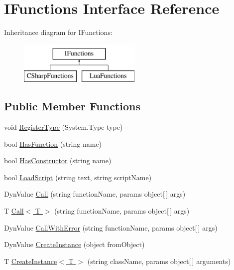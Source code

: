 \hypertarget{interface_i_functions}{}\section{I\+Functions Interface Reference}
\label{interface_i_functions}
Inheritance diagram for I\+Functions\+:\begin{figure}[H]
\begin{center}
\leavevmode
\includegraphics[height=2.000000cm]{interface_i_functions}
\end{center}
\end{figure}
\subsection*{Public Member Functions}
\begin{DoxyCompactItemize}
\item 
void \hyperlink{interface_i_functions_ab61bd915f0f4e1aa0b2ba6fe268a4790}{Register\+Type} (System.\+Type type)
\item 
bool \hyperlink{interface_i_functions_a55a472175a59db8ec3b00c5dad20cf20}{Has\+Function} (string name)
\item 
bool \hyperlink{interface_i_functions_a41edac00a2af1290932ae95536f987f9}{Has\+Constructor} (string name)
\item 
bool \hyperlink{interface_i_functions_acdee59b5855ab9e87fcf11e3cdf9c967}{Load\+Script} (string text, string script\+Name)
\item 
Dyn\+Value \hyperlink{interface_i_functions_a0d5502d86d4b34c04f36d7f8a41c5f27}{Call} (string function\+Name, params object\mbox{[}$\,$\mbox{]} args)
\item 
T \hyperlink{interface_i_functions_ab14a9a3261c860d7dba22a9c927f1068}{Call$<$ T $>$} (string function\+Name, params object\mbox{[}$\,$\mbox{]} args)
\item 
Dyn\+Value \hyperlink{interface_i_functions_a6914f7ab45913120802554ac2ef28dba}{Call\+With\+Error} (string function\+Name, params object\mbox{[}$\,$\mbox{]} args)
\item 
Dyn\+Value \hyperlink{interface_i_functions_a7578bf930745a057a9e24f6048858fe2}{Create\+Instance} (object from\+Object)
\item 
T \hyperlink{interface_i_functions_a5acd536d97990a6d5d575dce8bfff5f1}{Create\+Instance$<$ T $>$} (string class\+Name, params object\mbox{[}$\,$\mbox{]} arguments)
\end{DoxyCompactItemize}


